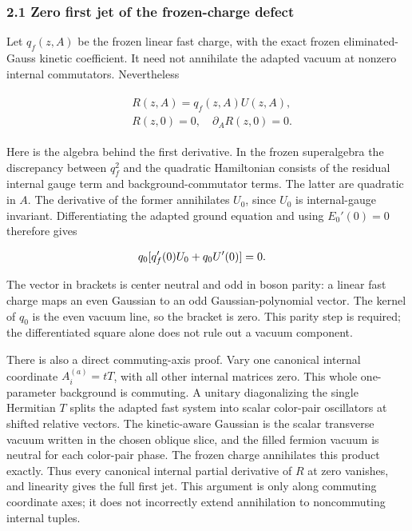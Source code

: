 \subsubsection{2.1 Zero first jet of the frozen-charge
defect}\label{c-zero-first-jet-of-the-frozen-charge-defect}

Let \(q_{f}(z,A)\) be the frozen linear fast charge, with the exact
frozen eliminated-Gauss kinetic coefficient. It need not annihilate the
adapted vacuum at nonzero internal commutators. Nevertheless

\begin{gather*}
\begin{aligned}
& R(z,A)=q_{f}(z,A)U(z,A), \\
& R(z,0)=0, \quad  \partial _{A} R(z,0)=0.
\end{aligned}\tag{2.3}
\end{gather*}

Here is the algebra behind the first derivative. In the frozen
superalgebra the discrepancy between \(q_{f}^{2}\) and the quadratic
Hamiltonian consists of the residual internal gauge term and
background-commutator terms. The latter are quadratic in \(A\). The
derivative of the former annihilates \(U_{0}\), since \(U_{0}\) is
internal-gauge invariant. Differentiating the adapted ground equation
and using \(E_{0}'(0)=0\) therefore gives

\begin{gather*}
\begin{aligned}
& q_{0} [q_{f}'(0)U_{0} + q_{0} U'(0)] = 0.
\end{aligned}\notag
\end{gather*}

The vector in brackets is center neutral and odd in boson parity: a
linear fast charge maps an even Gaussian to an odd Gaussian-polynomial
vector. The kernel of \(q_{0}\) is the even vacuum line, so the bracket
is zero. This parity step is required; the differentiated square alone
does not rule out a vacuum component.

There is also a direct commuting-axis proof. Vary one canonical internal
coordinate \(A_{i}^{(a)}=t T\), with all other internal matrices zero.
This whole one-parameter background is commuting. A unitary
diagonalizing the single Hermitian \(T\) splits the adapted fast system
into scalar color-pair oscillators at shifted relative vectors. The
kinetic-aware Gaussian is the scalar transverse vacuum written in the
chosen oblique slice, and the filled fermion vacuum is neutral for each
color-pair phase. The frozen charge annihilates this product exactly.
Thus every canonical internal partial derivative of \(R\) at zero
vanishes, and linearity gives the full first jet. This argument is only
along commuting coordinate axes; it does not incorrectly extend
annihilation to noncommuting internal tuples.

